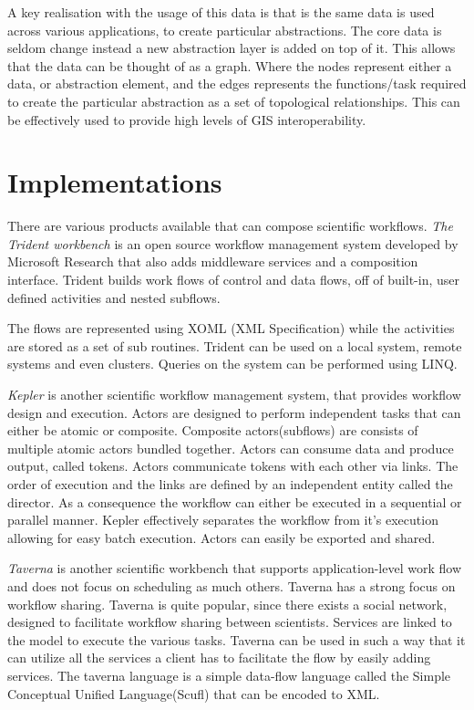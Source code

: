 \documentclass[11pt,twocolumn]{article}
\begin{document}
    A key realisation with the usage of this data is that
    is the same data is used across various applications,
    to create particular abstractions. The core data is
    seldom change instead a new abstraction layer is added
    on top of it. This allows that the data can be thought
    of as a graph. Where the nodes represent either a data,
    or abstraction element, and the edges represents the
    functions/task required to create the particular abstraction
    as a set of topological
    relationships. This can be effectively used to provide
    high levels of GIS
    interoperability\cite{ElAdnani:2001:MLF:512161.512177}.

\section{Implementations}
    There are various products available that can compose
    scientific workflows. \emph{The Trident workbench}
    \cite{Simmhan:2009:BTS:1673063.1673121} is an open
    source workflow management system developed by Microsoft
    Research that also adds middleware services and a
    composition interface. Trident builds work flows of control
    and data flows, off of built-in, user defined activities and
    nested subflows.

    The flows are represented using XOML (XML Specification) while
    the activities are stored as a set of sub routines. Trident
    can be used on a local system, remote systems and even clusters.
    Queries on the system can be performed using LINQ.
    \cite{Simmhan2011790}

    \emph{Kepler} is another scientific workflow
    management system, that
    provides workflow design and execution. Actors are designed
    to perform independent tasks that can either be atomic or
    composite. Composite actors(subflows) are consists of multiple
    atomic actors bundled together. Actors can consume data and
    produce output, called tokens. Actors communicate tokens with
    each other via links. The order of execution and the links are
    defined by an independent entity called the director. As a
    consequence the workflow can either be executed in a
    sequential or parallel manner. Kepler effectively separates
    the workflow from it's execution allowing for easy batch
    execution. Actors can easily be exported and shared.
    \cite{Wang:2009:KHG:1645164.1645176}

    \emph{Taverna} is another scientific workbench that supports
    application-level work flow and does not focus on scheduling
    as much others. Taverna has a strong focus on workflow
    sharing. Taverna is quite popular, since there exists
    a social network, designed to facilitate workflow sharing
    between scientists. Services are linked to the model to
    execute the various tasks. Taverna can be used in such
    a way that it can utilize all the services a client has
    to facilitate the flow by easily adding services. The
    taverna language is a simple data-flow language called
    the Simple Conceptual Unified Language(Scufl) that can
    be encoded to XML\cite{4721191}.
\end{document}
